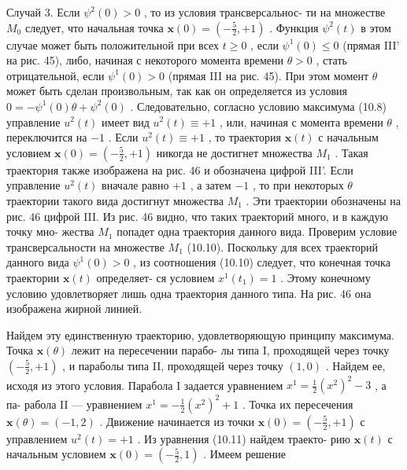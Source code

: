 \documentclass[8pt]{extarticle}
\begin{document}
Случай 3. Если \({\psi }^{2}\left( 0\right)  > 0\) , то из условия трансверсальнос- ти на множестве \({M}_{0}\) следует, что начальная точка \(\mathbf{x}\left( 0\right)  = \left( {-\frac{5}{2}, + 1}\right)\) . Функция \({\psi }^{2}\left( t\right)\) в этом случае может быть положительной при всех \(t \geq  0\) , если \({\psi }^{1}\left( 0\right)  \leq  0\) (прямая III' на рис. 45), либо, начиная с некоторого момента времени \(\theta  > 0\) , стать отрицательной, если \({\psi }^{1}\left( 0\right)  > 0\) (прямая III на рис. 45). При этом момент \(\theta\) может быть сделан произвольным, так как он определяется из условия \(0 =  - {\psi }^{1}\left( 0\right) \theta  + {\psi }^{2}\left( 0\right)\) . Следовательно, согласно условию максимума (10.8) управление \({u}^{2}\left( t\right)\) имеет вид \({u}^{2}\left( t\right)  \equiv   + 1\) , или, начиная с момента времени \(\theta\) , переключится на \(-1\) . Если \({u}^{2}\left( t\right)  \equiv   + 1\) , то траектория \(\mathbf{x}\left( t\right)\) с начальным условием \(\mathbf{x}\left( 0\right)  = \left( {-\frac{5}{2}, + 1}\right)\) никогда не достигнет множества \({M}_{1}\) . Такая траектория также изображена на рис. 46 и обозначена цифрой III'. Если управление \({u}^{2}\left( t\right)\) вначале равно \(+1\) , а затем \(-1\) , то при некоторых \(\theta\) траектории такого вида достигнут множества \({M}_{1}\) . Эти траектории обозначены на рис. 46 цифрой III. Из рис. 46 видно, что таких траекторий много, и в каждую точку мно- жества \({M}_{1}\) попадет одна траектория данного вида. Проверим условие трансверсальности на множестве \({M}_{1}\) (10.10). Поскольку для всех траекторий данного вида \({\psi }^{1}\left( 0\right)  > 0\) , из соотношения (10.10) следует, что конечная точка траектории \(\mathbf{x}\left( t\right)\) определяет- ся условием \({x}^{1}\left( {t}_{1}\right)  = 1\) . Этому конечному условию удовлетворяет лишь одна траектория данного типа. На рис. 46 она изображена жирной линией.

Найдем эту единственную траекторию, удовлетворяющую принципу максимума. Точка \(\mathbf{x}\left( \theta \right)\) лежит на пересечении парабо- лы типа I, проходящей через точку \(\left( {-\frac{5}{2}, + 1}\right)\) , и параболы типа II, проходящей через точку \((1,0)\) . Найдем ее, исходя из этого условия. Парабола I задается уравнением \({x}^{1} = \frac{1}{2}{\left( {x}^{2}\right) }^{2} - 3\) , а па- рабола II — уравнением \({x}^{1} =  - \frac{1}{2}{\left( {x}^{2}\right) }^{2} + 1\) . Точка их пересечения \(\mathbf{x}\left( \theta \right)  = \left( {-1,2}\right)\) . Движение начинается из точки \(\mathbf{x}\left( 0\right)  = \left( {-\frac{5}{2}, + 1}\right)\) с управлением \({u}^{2}\left( t\right)  =  + 1\) . Из уравнения (10.11) найдем траекто- рию \(\mathbf{x}\left( t\right)\) с начальным условием \(\mathbf{x}\left( 0\right)  = \left( {-\frac{5}{2},1}\right)\) . Имеем решение
\end{document}
